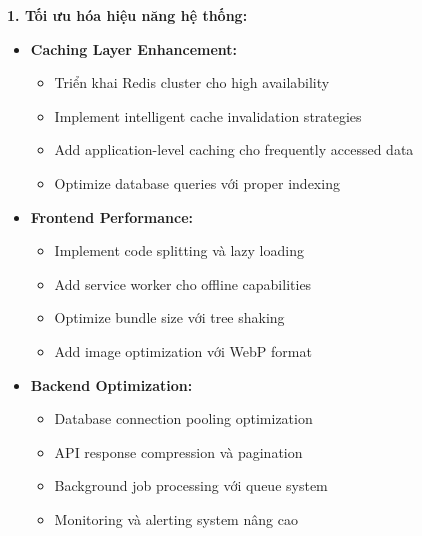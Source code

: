 \documentclass[../DoAn.tex]{subfiles}
\begin{document}
\textbf{1. Tối ưu hóa hiệu năng hệ thống:}
\begin{itemize}
    \item \textbf{Caching Layer Enhancement:}
    \begin{itemize}
        \item Triển khai Redis cluster cho high availability
        \item Implement intelligent cache invalidation strategies
        \item Add application-level caching cho frequently accessed data
        \item Optimize database queries với proper indexing
    \end{itemize}
    
    \item \textbf{Frontend Performance:}
    \begin{itemize}
        \item Implement code splitting và lazy loading
        \item Add service worker cho offline capabilities
        \item Optimize bundle size với tree shaking
        \item Add image optimization với WebP format
    \end{itemize}
    
    \item \textbf{Backend Optimization:}
    \begin{itemize}
        \item Database connection pooling optimization
        \item API response compression và pagination
        \item Background job processing với queue system
        \item Monitoring và alerting system nâng cao
    \end{itemize}
\end{itemize}
\end{document}
